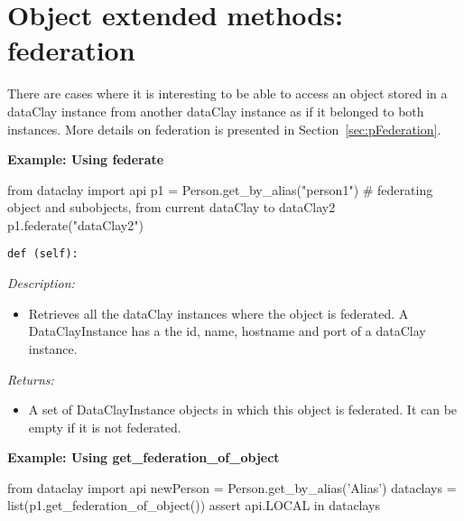 \section{Object extended methods: federation}
\label{sec:pObjectFederation}

There are cases where it is interesting to be able to access an object stored in a dataClay instance from another dataClay instance as if it belonged to both instances. More details on federation is presented in Section~\ref{sec:pFederation}.


\begin{tBox}
\textcolor{basecolor} {\bf Example: Using federate}
\begin{python}
from dataclay import api
p1 = Person.get_by_alias("person1")
# federating object and subobjects, from current dataClay to dataClay2
p1.federate("dataClay2")
\end{python}
\end{tBox}


\begin{dBox}
\texttt{def (self):}
\LINE

{\it Description:}

\begin{itemize}
 \item Retrieves all the dataClay instances where the object is federated. 
 A DataClayInstance has a the id, name, hostname and port of a dataClay instance.
\end{itemize}

{\it Returns:}

\begin{itemize}
 \item A set of DataClayInstance objects in which this object is federated. 
 It can be empty if it is not federated.
\end{itemize}

\end{dBox}

\begin{tBox}
\textcolor{basecolor} {\bf Example: Using get\_federation\_of\_object}
\begin{python}
from dataclay import api
newPerson = Person.get_by_alias('Alias')
dataclays = list(p1.get_federation_of_object())
assert api.LOCAL in dataclays
\end{python}
\end{tBox}


